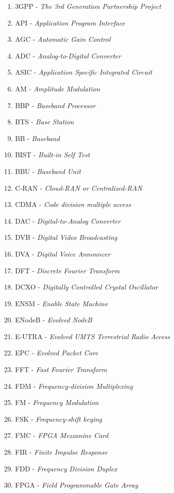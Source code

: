 \begin{enumerate}
  \item 3GPP - \textit{The 3rd Generation Partnership Project}

  \item API - \textit{Application Program Interface}
  \item AGC - \textit{Automatic Gain Control}
  \item ADC - \textit{Analog-to-Digital Converter}
  \item ASIC - \textit{Application Specific Integrated Circuit}
  \item AM - \textit{Amplitude Modulation}

  \item BBP - \textit{Baseband Processor}
  \item BTS - \textit{Base Station}
  \item BB - \textit{Baseband}
  \item BIST - \textit{Built-in Self Test}
  \item BBU - \textit{Baseband Unit}

  \item C-RAN - \textit{Cloud-RAN or Centralized-RAN}
  \item CDMA - \textit{Code division multiple access}

  \item DAC - \textit{Digital-to-Analog Converter}
  \item DVB - \textit{Digital Video Broadcasting}
	\item DVA - \textit{Digital Voice Announcer}
  \item DFT - \textit{Discrete Fourier Transform}
  \item DCXO - \textit{Digitally Controlled Crystal Oscillator}

  \item ENSM - \textit{Enable State Machine}
  \item ENodeB - \textit{Evolved NodeB}
  \item E-UTRA - \textit{Evolved UMTS Terrestrial Radio Access}
  \item EPC - \textit{Evolved Packet Core}

  \item FFT - \textit{Fast Fourier Transform}
  \item FDM - \textit{Frequency-division Multiplexing}
  \item FM - \textit{Frequency Modulation}
  \item FSK - \textit{Frequency-shift keying}
  \item FMC - \textit{FPGA Mezzanine Card}
  \item FIR - \textit{Finite Impulse Response}
  \item FDD - \textit{Frequency Division Duplex}
  \item FPGA - \textit{Field Programmable Gate Array}


\end{enumerate}
